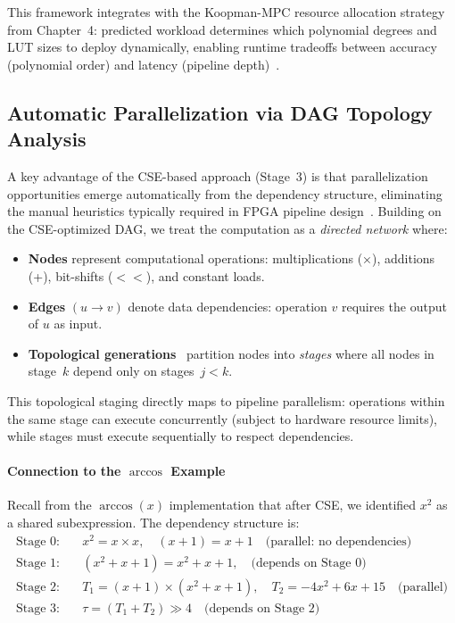 This framework integrates with the Koopman-MPC resource allocation strategy from Chapter~4: predicted workload determines which polynomial degrees and LUT sizes to deploy dynamically, enabling runtime tradeoffs between accuracy (polynomial order) and latency (pipeline depth)~\cite{Bhandari2012,Silva2016}.

\subsection{Automatic Parallelization via DAG Topology Analysis}
\label{sec:dag_parallelization}

A key advantage of the CSE-based approach (Stage~3) is that parallelization opportunities emerge automatically from the dependency structure, eliminating the manual heuristics typically required in FPGA pipeline design~\cite{Mehdizadeh2004,Gustafsson2007}. Building on the CSE-optimized DAG, we treat the computation as a \emph{directed network} where:
\begin{itemize}
    \item \textbf{Nodes} represent computational operations: multiplications (×), additions (+), bit-shifts ($<<$), and constant loads.
    \item \textbf{Edges} $(u \to v)$ denote data dependencies: operation $v$ requires the output of $u$ as input.
    \item \textbf{Topological generations}~\cite{Kahn1962} partition nodes into \emph{stages} where all nodes in stage~$k$ depend only on stages~$j < k$.
\end{itemize}

This topological staging directly maps to pipeline parallelism: operations within the same stage can execute concurrently (subject to hardware resource limits), while stages must execute sequentially to respect dependencies.

\paragraph{Connection to the $\arccos$ Example}

Recall from the $\arccos(x)$ implementation that after CSE, we identified $x^2$ as a shared subexpression. The dependency structure is:
\begin{align*}
    \text{Stage~0:} \quad & x^2 = x \times x, \quad (x+1) = x + 1 \quad \text{(parallel: no dependencies)} \\
    \text{Stage~1:} \quad & (x^2 + x + 1) = x^2 + x + 1, \quad \text{(depends on Stage~0)} \\
    \text{Stage~2:} \quad & T_1 = (x+1) \times (x^2+x+1), \quad T_2 = -4x^2 + 6x + 15 \quad \text{(parallel)} \\
    \text{Stage~3:} \quad & \tau = (T_1 + T_2) \gg 4 \quad \text{(depends on Stage~2)}
\end{align*}

